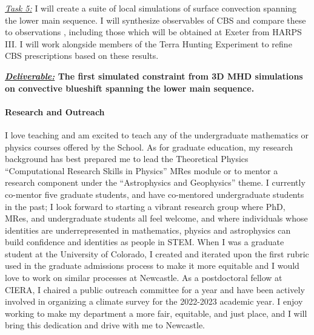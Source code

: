 \documentclass[12pt]{article}
\begin{document}
\underline{\emph{Task 5:}} I will create a suite of local simulations of surface convection spanning the lower main sequence.
I will synthesize observables of CBS and compare these to observations \citep{liebing_etal_2021}, including those which will be obtained at Exeter from HARPS III.
I will work alongside members of the Terra Hunting Experiment to refine CBS prescriptions based on these results.

\textbf{\underline{\emph{Deliverable:}} The first simulated constraint from 3D MHD simulations on convective blueshift spanning the lower main sequence.}


\paragraph*{Research and Outreach}
I love teaching and am excited to teach any of the undergraduate mathematics or physics courses offered by the School. 
As for graduate education, my research background has best prepared me to lead the Theoretical Physics ``Computational Research Skills in Physics'' MRes module or to mentor a research component under the ``Astrophysics and Geophysics'' theme.
I currently co-mentor five graduate students, and have co-mentored undergraduate students in the past; I look forward to starting a vibrant research group where PhD, MRes, and undergraduate students all feel welcome, and where individuals whose identities are underrepresented in mathematics, physics and astrophysics can build confidence and identities as people in STEM.
When I was a graduate student at the University of Colorado, I created and iterated upon the first rubric used in the graduate admissions process to make it more equitable and I would love to work on similar processes at Newcastle.
As a postdoctoral fellow at CIERA, I chaired a public outreach committee for a year and have been actively involved in organizing a climate survey for the 2022-2023 academic year.
I enjoy working to make my department a more fair, equitable, and just place, and I will bring this dedication and drive with me to Newcastle.

{\scriptsize

}
\end{document}
